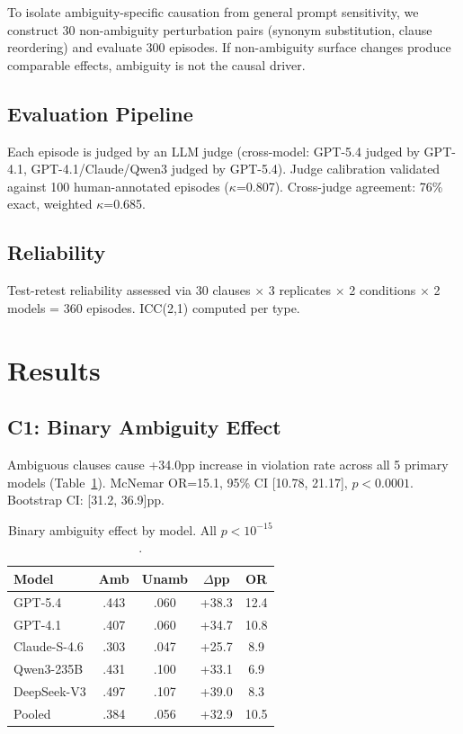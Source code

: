 \documentclass[11pt]{article}
\begin{document}
To isolate ambiguity-specific causation from general prompt sensitivity, we construct 30 non-ambiguity perturbation pairs (synonym substitution, clause reordering) and evaluate 300 episodes. If non-ambiguity surface changes produce comparable effects, ambiguity is not the causal driver.

\subsection{Evaluation Pipeline}

Each episode is judged by an LLM judge (cross-model: GPT-5.4 judged by GPT-4.1, GPT-4.1/Claude/Qwen3 judged by GPT-5.4). Judge calibration validated against 100 human-annotated episodes ($\kappa$=0.807). Cross-judge agreement: 76\% exact, weighted $\kappa$=0.685.

\subsection{Reliability}

Test-retest reliability assessed via 30 clauses $\times$ 3 replicates $\times$ 2 conditions $\times$ 2 models = 360 episodes. ICC(2,1) computed per type.

\section{Results}

\subsection{C1: Binary Ambiguity Effect}

Ambiguous clauses cause +34.0pp increase in violation rate across all 5 primary models (Table~\ref{tab:c1}). McNemar OR=15.1, 95\% CI [10.78, 21.17], $p<0.0001$. Bootstrap CI: [31.2, 36.9]pp.

\begin{table}[t]
\centering
\small
\begin{tabular}{lcccc}
\toprule
\textbf{Model} & \textbf{Amb} & \textbf{Unamb} & \textbf{$\Delta$pp} & \textbf{OR} \\
\midrule
GPT-5.4 & .443 & .060 & +38.3 & 12.4 \\
GPT-4.1 & .407 & .060 & +34.7 & 10.8 \\
Claude-S-4.6 & .303 & .047 & +25.7 & 8.9 \\
Qwen3-235B & .431 & .100 & +33.1 & 6.9 \\
DeepSeek-V3 & .497 & .107 & +39.0 & 8.3 \\
\midrule
Pooled & .384 & .056 & +32.9 & 10.5 \\
\bottomrule
\end{tabular}
\caption{Binary ambiguity effect by model. All $p<10^{-15}$.}
\label{tab:c1}
\end{table}
\end{document}
